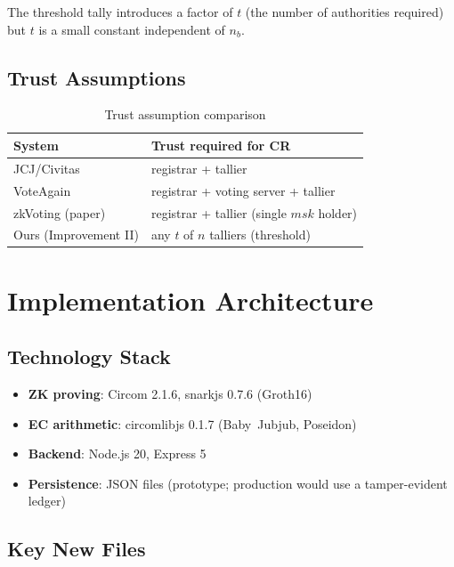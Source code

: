 \documentclass[conference]{IEEEtran}
\begin{document}
\noindent The threshold tally introduces a factor of $t$ (the number of
authorities required) but $t$ is a small constant independent of $n_b$.

\subsection{Trust Assumptions}

\begin{table}[h]
\centering
\caption{Trust assumption comparison}
\label{tab:trust}
\renewcommand{\arraystretch}{1.15}
\begin{tabular}{lp{5.5cm}}
\toprule
\textbf{System} & \textbf{Trust required for CR} \\
\midrule
JCJ/Civitas     & registrar + tallier \\
VoteAgain       & registrar + voting server + tallier \\
zkVoting (paper) & registrar + tallier (single $\mathit{msk}$ holder) \\
Ours (Improvement II) & any $t$ of $n$ talliers (threshold) \\
\bottomrule
\end{tabular}
\end{table}

\section{Implementation Architecture}
\label{sec:arch}

\subsection{Technology Stack}

\begin{itemize}
  \item \textbf{ZK proving}: Circom 2.1.6, snarkjs 0.7.6 (Groth16)
  \item \textbf{EC arithmetic}: circomlibjs 0.1.7 (Baby~Jubjub, Poseidon)
  \item \textbf{Backend}: Node.js 20, Express 5
  \item \textbf{Persistence}: JSON files (prototype; production would use a
    tamper-evident ledger)
\end{itemize}

\subsection{Key New Files}
\end{document}
